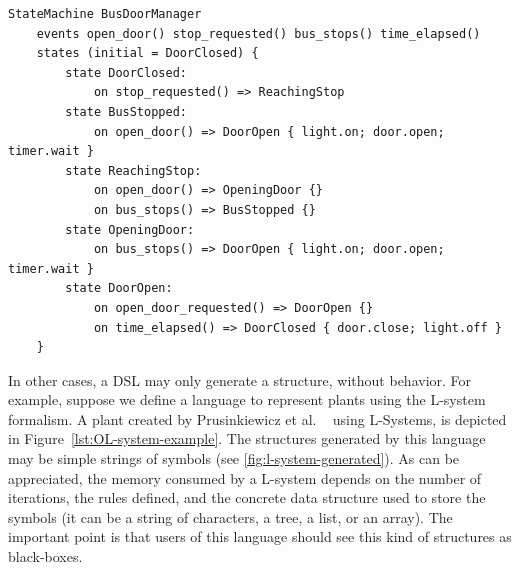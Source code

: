 \begin{lstlisting}[caption={State machine to control the door of a bus.},label={lst:state-machine},style=statemachinelang,frame=single]
StateMachine BusDoorManager
	events open_door() stop_requested() bus_stops() time_elapsed() 
	states (initial = DoorClosed) {
		state DoorClosed:
			on stop_requested() => ReachingStop
		state BusStopped:
			on open_door() => DoorOpen { light.on; door.open; timer.wait }
		state ReachingStop:
			on open_door() => OpeningDoor {}
			on bus_stops() => BusStopped {}
		state OpeningDoor:
			on bus_stops() => DoorOpen { light.on; door.open; timer.wait }
		state DoorOpen:
			on open_door_requested() => DoorOpen {}
			on time_elapsed() => DoorClosed { door.close; light.off }
	}
\end{lstlisting}

In other cases, a DSL may only generate a structure, without behavior.
For example, suppose we define a language to represent plants using the L-system~\cite{Prusinkiewicz1990} formalism.
A plant created by Prusinkiewicz et al. ~\cite{Prusinkiewicz1990} using L-Systems, is depicted in Figure~\ref{lst:OL-system-example}.
The structures generated by this language may be simple strings of symbols (see \ref{fig:l-system-generated}).
As can be appreciated, the memory consumed by a L-system depends on the number of iterations, the rules defined, and the concrete data structure used to store the symbols
(it can be a string of characters, a tree, a list, or an array).
The important point is that users of this language should see this kind of structures as black-boxes.



